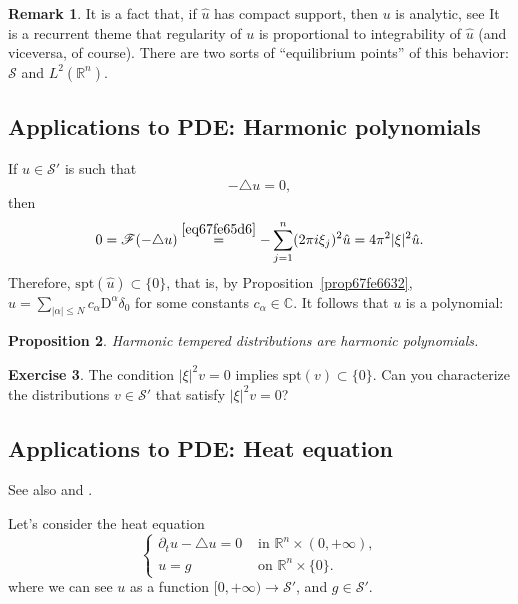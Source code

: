 \documentclass[a4paper,9pt]{amsart}
\newcommand{\scr}[1]{\mathscr{#1}}
\newcommand{\R}{\mathbb{R}}	%
\newcommand{\C}{\mathbb{C}}	%
\newcommand{\de}{\partial}		%
\newcommand{\Diff}{\mathrm{D}}
\newcommand{\spt}{\mathrm{spt}}
\newcommand{\laplacian}{\triangle}
\theoremstyle{plain}
\newtheorem{proposition}{Proposition}[section]
\theoremstyle{definition}
\newtheorem{remark}[proposition]{Remark}
\newtheorem{exercise}[proposition]{Exercise}%
\theoremstyle{remark}
\begin{document}
\begin{remark}
	It is a fact that, if $\hat u$ has compact support, then $u$ is analytic, see \cite[Thm 7.1.14]{MR717035}
	It is a recurrent theme that regularity of $u$ is proportional to integrability of $\hat u$ (and viceversa, of course).
	There are two sorts of ``equilibrium points'' of this behavior: $\scr S$ and $L^2(\R^n)$.
\end{remark}


\subsection{Applications to PDE: Harmonic polynomials}
If $u\in\scr S'$ is such that 
\begin{equation}
	-\laplacian u = 0 ,
\end{equation}
then 
\begin{equation}
	0 = \scr F(-\laplacian u)
	\overset{\eqref{eq67fe65d6}}= - \sum_{j=1}^n(2\pi i\xi_j)^2 \hat u
	= 4\pi^2 |\xi|^2 \hat u .
\end{equation}
Therefore, $\spt(\hat u) \subset\{0\}$, that is, by Proposition~\ref{prop67fe6632},
$\hat u = \sum_{|\alpha|\le N} c_\alpha \Diff^\alpha \delta_0$ for some constants $c_\alpha\in\C$.
It follows that $u$ is a polynomial:

\begin{proposition}
	Harmonic tempered distributions are harmonic polynomials.
\end{proposition}

\begin{exercise}
	The condition $|\xi|^2 v=0$ implies $\spt(v) \subset\{0\}$.
	Can you characterize the distributions $v\in\scr S'$ that satisfy $|\xi|^2 v=0$?
\end{exercise}

\subsection{Applications to PDE: Heat equation}%
See also \cite[\S4.A,p.143]{MR1357411} and \cite[p.192]{MR2597943}.

Let's consider the heat equation
\begin{equation}\label{eq680346f3}
\begin{cases}
	\de_t u - \laplacian u = 0 & \text{ in }\R^n\times(0,+\infty) ,\\
	u = g & \text{ on } \R^n\times\{0\} .
\end{cases}
\end{equation}
where we can see $u$ as a function $[0,+\infty)\to \scr S'$, and $g\in\scr S'$.
\end{document}
